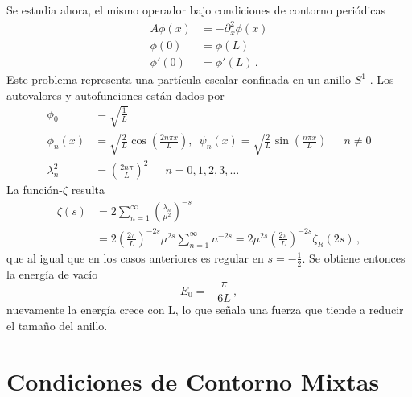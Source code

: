 Se estudia ahora, el mismo operador bajo condiciones de contorno periódicas
\begin{equation}
\begin{aligned}
	A \phi (x) &= - \partial _x ^2 \phi (x) \\[5pt]
    \phi (0) &= \phi (L)  \\[5pt]
    \phi ' (0) &= \phi ' (L) \, .
\end{aligned}
\end{equation}
Este problema representa una partícula escalar confinada en un anillo $S ^1$ .
Los autovalores y autofunciones están dados por
\begin{align}
\nonumber
	\phi _{0} &= \sqrt{\frac{1}{L}} 
\\[5pt]
\nonumber
	\phi _{n} (x) &= \sqrt{\frac{2}{L}} \cos \left( \frac{2 n \pi x}{L} 
	\right),
	\, \, \,  \psi _n (x) =\sqrt{\frac{2}{L}} \sin \left( \frac{n \pi 		x}{L} \right) 
	\, \, \, \, \, \, \, \, \, n \neq 0
	\\[5pt]
	\lambda ^2 _n  &= \left( \frac{2 n \pi }{L} \right) ^2 
	\, \, \, \, \, \, \, \, \,
	 n = 0,1,2,3, \dots
\end{align}
La función-$\zeta$ resulta
\begin{align}
\nonumber
	\zeta  (s) &= 
	2 \sum _{n=1} ^{\infty} \left( \frac{\lambda _n}{\mu ^2} \right)^
	{-s} 
	\\[5pt]
&=  2 \left( \frac{2 \pi}{L} \right) ^{-2s} \mu ^{2s} \sum _{n=1} ^{\infty} n ^{-2s} =  
2 \mu ^{2s} \left( \frac{2 \pi}{L} \right) ^{-2s} \zeta _R (2s)
\, ,
\end{align}
que al igual que en los casos anteriores es regular en $s=- \frac{1}{2}$. Se obtiene
entonces la energía de vacío
\begin{equation}
E _0 = - \frac{\pi}{6 L} \, ,
\end{equation}
nuevamente la energía crece con L, lo que señala una fuerza que tiende a
reducir el tamaño del anillo.

\section{Condiciones de Contorno Mixtas}



